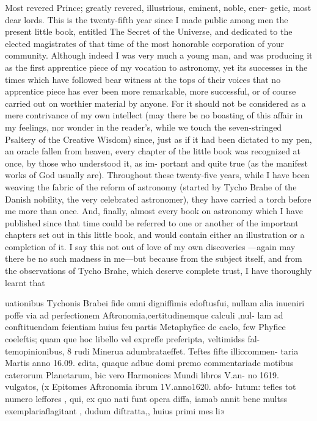 \documentclass{article}
\begin{document}
Most revered Prince; greatly revered, illustrious, eminent, noble, ener-
getic, most dear lords. This is the twenty-fifth year since I made public
among men the present little book, entitled The Secret of the Universe,
and dedicated to the elected magistrates of that time of the most
honorable corporation of your community. Although indeed I was very
much a young man, and was producing it as the first apprentice piece of
my vocation to astronomy, yet its successes in the times which have
followed bear witness at the tops of their voices that no apprentice piece
has ever been more remarkable, more successful, or of course carried out
on worthier material by anyone. For it should not be considered as a
mere contrivance of my own intellect (may there be no boasting of this
affair in my feelings, nor wonder in the reader’s, while we touch the
seven-stringed Psaltery of the Creative Wisdom) since, just as if it had
been dictated to my pen, an oracle fallen from heaven, every chapter of
the little book was recognized at once, by those who understood it, as im-
portant and quite true (as the manifest works of God usually are).
Throughout these twenty-five years, while I have been weaving the fabric
of the reform of astronomy (started by Tycho Brahe of the Danish
nobility, the very celebrated astronomer), they have carried a torch
before me more than once. And, finally, almost every book on
astronomy which I have published since that time could be referred to
one or another of the important chapters set out in this little book, and
would contain either an illustration or a completion of it. I say this not
out of love of my own discoveries —again may there be no such madness
in me—but because from the subject itself, and from the observations of
Tycho Brahe, which deserve complete trust, I have thoroughly learnt that

uationibus Tychonis Brabei fide omni digniffimis edoftusfui, nullam alia
inueniri poffe via ad perfectionem Aftronomia,certitudinemque calculi ,nul-
lam ad conftituendam feientiam huius feu partis Metaphyfice de caclo, few
Phyfice coeleftis; quam que hoc libello vel expreffe preferipta, veltimidss fal-
temopinionibus, 8 rudi Minerua adumbrataeffet. Teftes fifte illiccommen-
taria Martis anno 16.09. ¢dita, quaque adbuc domi premo commentariade
motibus caterorum Planetarum, bic vero Harmonices Mundi libros V.an-
no 1619. vulgatos, (x Epitomes Aftronomia ibrum 1V.anno1620. abfo-
lutum: tefles tot numero leffores , qui, ex quo nati funt opera diffa, iamab
annit bene multss exemplariaflagitant , dudum diftratta,, huius primi mes li»
\end{document}
